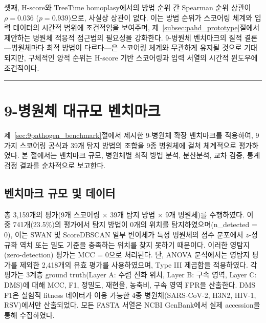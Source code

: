 셋째, H-score와 TreeTime homoplasy에서의 방법 순위 간 Spearman 순위 상관이 $\rho = 0.036$ ($p = 0.939$)으로, 사실상 상관이 없다.
이는 방법 순위가 스코어링 체계와 입력 데이터의 시간적 범위에 조건적임을 보여주며, 제~\ref{subsec:pahd_prototype}절에서 제안하는 병원체 적응적 접근법의 필요성을 강화한다.
9-병원체 벤치마크의 질적 결론---병원체마다 최적 방법이 다르다---은 스코어링 체계와 무관하게 유지될 것으로 기대되지만, 구체적인 양적 순위는 H-score 기반 스코어링과 입력 서열의 시간적 윈도우에 조건적이다.

\vspace{1em}
\noindent\rule{\textwidth}{0.4pt}
\vspace{0.5em}


\section{9-병원체 대규모 벤치마크}
\label{sec:9pathogen_results}


제~\ref{sec:9pathogen_benchmark}절에서 제시한 9-병원체 확장 벤치마크를 적용하여, 9가지 스코어링 공식과 39개 탐지 방법의 조합을 9종 병원체에 걸쳐 체계적으로 평가하였다.
본 절에서는 벤치마크 규모, 병원체별 최적 방법 분석, 분산분석, 교차 검증, 통계 검정 결과를 순차적으로 보고한다.


\subsection{벤치마크 규모 및 데이터}
\label{subsec:9pathogen_scale}


총 3,159개의 평가(9개 스코어링 $\times$ 39개 탐지 방법 $\times$ 9개 병원체)를 수행하였다.
이 중 741개(23.5\%)의 평가에서 탐지 방법이 0개의 위치를 탐지하였으며(n\_detected = 0), 이는 SWAN 및 ScoreDBSCAN 일부 변이체가 특정 병원체의 점수 분포에서 $z$-정규화 역치 또는 밀도 기준을 충족하는 위치를 찾지 못하기 때문이다.
이러한 영탐지(zero-detection) 평가는 MCC = 0으로 처리된다. 단, ANOVA 분석에서는 영탐지 평가를 제외한 2,418개의 유효 평가를 사용하였으며, Type III 제곱합을 적용하였다.
각 평가는 3계층 ground truth(Layer A: 수렴 진화 위치, Layer B: 구속 영역, Layer C: DMS)에 대해 MCC, F1, 정밀도, 재현율, 농축비, 구속 영역 FPR을 산출한다.
DMS F1은 실험적 fitness 데이터가 이용 가능한 4종 병원체(SARS-CoV-2, H3N2, HIV-1, RSV)에서만 산출되었다.
모든 FASTA 서열은 NCBI GenBank에서 실제 accession을 통해 수집하였다.


